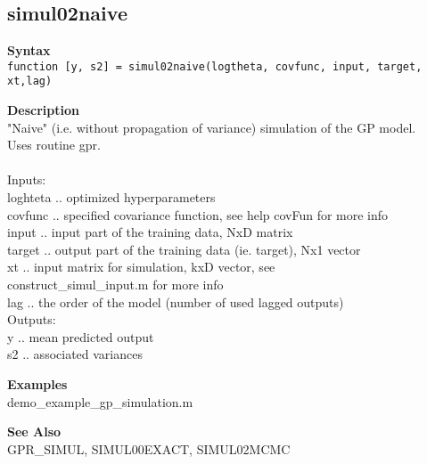 \subsection*{simul02naive} \label{fun:simul00naive}

\textbf{Syntax}
\\  \texttt{function [y, s2] = simul02naive(logtheta, covfunc, input, target,
xt,lag)}

\textbf{Description}
\\ "Naive" (i.e. without propagation of variance) simulation of the GP
 model.
\\ Uses routine gpr.
\\
\\ Inputs:
\\ loghteta .. optimized hyperparameters
\\ covfunc .. specified covariance function, see help covFun for more info
\\ input .. input part of the training data,  NxD matrix
\\ target .. output part of the training data (ie. target), Nx1 vector
\\ xt .. input matrix for simulation, kxD vector, see
\\   construct\_simul\_input.m for more info
\\ lag .. the order of the model (number of used lagged outputs)
\\ Outputs:
\\ y .. mean predicted output
\\ s2 .. associated variances

\textbf{Examples}
\\ demo\_example\_gp\_simulation.m

\textbf{See Also}
\\ GPR\_SIMUL, SIMUL00EXACT, SIMUL02MCMC
